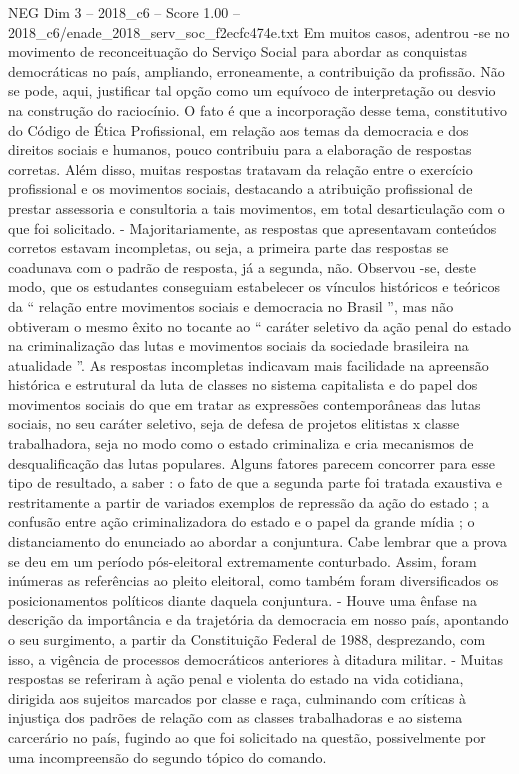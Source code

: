 \begin{textsample}{NEG Dim 3 – 2018\_c6 – Score 1.00 – 2018\_c6/enade\_2018\_serv\_soc\_f2ecfc474e.txt}
Em muitos casos, adentrou -se no movimento de reconceituação do Serviço Social para abordar as conquistas democráticas no país, ampliando, erroneamente, a contribuição da profissão.
Não se pode, aqui, justificar tal opção como um equívoco de interpretação ou desvio na construção do raciocínio.
O fato é que a incorporação desse tema, constitutivo do Código de Ética Profissional, em relação aos temas da democracia e dos direitos sociais e humanos, pouco contribuiu para a elaboração de respostas corretas.
Além disso, muitas respostas tratavam da relação entre o exercício profissional e os movimentos sociais, destacando a atribuição profissional de prestar assessoria e consultoria a tais movimentos, em total desarticulação com o que foi solicitado. - Majoritariamente, as respostas que apresentavam conteúdos corretos estavam incompletas, ou seja, a primeira parte das respostas se coadunava com o padrão de resposta, já a segunda, não.
Observou -se, deste modo, que os estudantes conseguiam estabelecer os vínculos históricos e teóricos da “ relação entre movimentos sociais e democracia no Brasil ”, mas não obtiveram o mesmo êxito no tocante ao “ caráter seletivo da ação penal do estado na criminalização das lutas e movimentos sociais da sociedade brasileira na atualidade ”.
As respostas incompletas indicavam mais facilidade na apreensão histórica e estrutural da luta de classes no sistema capitalista e do papel dos movimentos sociais do que em tratar as expressões contemporâneas das lutas sociais, no seu caráter seletivo, seja de defesa de projetos elitistas x classe trabalhadora, seja no modo como o estado criminaliza e cria mecanismos de desqualificação das lutas populares.
Alguns fatores parecem concorrer para esse tipo de resultado, a saber : o fato de que a segunda parte foi tratada exaustiva e restritamente a partir de variados exemplos de repressão da ação do estado ; a confusão entre ação criminalizadora do estado e o papel da grande mídia ; o distanciamento do enunciado ao abordar a conjuntura.
Cabe lembrar que a prova se deu em um período pós-eleitoral extremamente conturbado.
Assim, foram inúmeras as referências ao pleito eleitoral, como também foram diversificados os posicionamentos políticos diante daquela conjuntura. - Houve uma ênfase na descrição da importância e da trajetória da democracia em nosso país, apontando o seu surgimento, a partir da Constituição Federal de 1988, desprezando, com isso, a vigência de processos democráticos anteriores à ditadura militar. - Muitas respostas se referiram à ação penal e violenta do estado na vida cotidiana, dirigida aos sujeitos marcados por classe e raça, culminando com críticas à injustiça dos padrões de relação com as classes trabalhadoras e ao sistema carcerário no país, fugindo ao que foi solicitado na questão, possivelmente por uma incompreensão do segundo tópico do comando.

\end{textsample}
